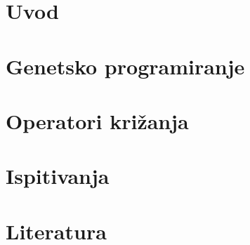 \documentclass[pdftex,12pt,a4paper]{report}
\begin{document}
\begin{spacing}{1.5}



\tableofcontents


\chapter{Uvod}



\chapter{Genetsko programiranje}


\chapter{Operatori križanja}


\chapter{Ispitivanja}


\chapter{Literatura}


\end{spacing} 
\end{document}
